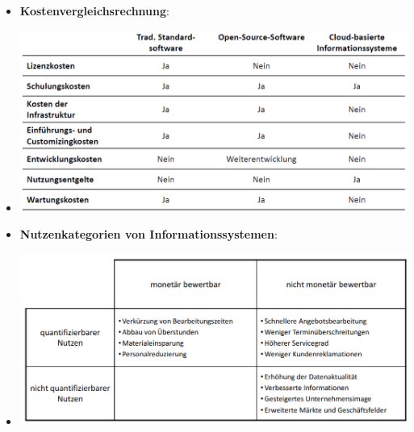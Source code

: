 \documentclass[12pt,a4paper]{article}
\begin{document}
\begin{itemize}
\begin{itemize}


\newpage %
         \item \textbf{Kostenvergleichsrechnung}:
         \item[] \includegraphics[scale=0.4]{Vergleichskosten.png}         
         
         \item \textbf{Nutzenkategorien von Informationssystemen}:
         \item[] \includegraphics[scale=0.45]{Nutzen.png}
      \end{itemize}
   

\end{itemize}
\end{document}
